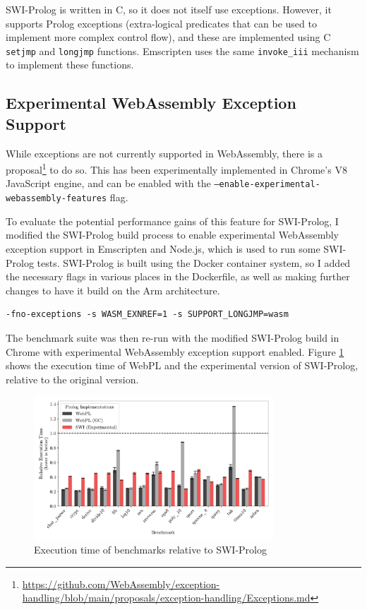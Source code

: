 SWI-Prolog is written in C, so it does not itself use exceptions. However, it supports Prolog exceptions (extra-logical predicates that can be used to implement more complex control flow), and these are implemented using C \texttt{setjmp} and \texttt{longjmp} functions. Emscripten uses the same \texttt{invoke\_iii} mechanism to implement these functions.

\subsection{Experimental WebAssembly Exception Support}

While exceptions are not currently supported in WebAssembly, there is a proposal\footnote{\url{https://github.com/WebAssembly/exception-handling/blob/main/proposals/exception-handling/Exceptions.md}} to do so. This has been experimentally implemented in Chrome's V8 JavaScript engine, and can be enabled with the \texttt{--enable-experimental-webassembly-features} flag.

To evaluate the potential performance gains of this feature for SWI-Prolog, I modified the SWI-Prolog build process to enable experimental WebAssembly exception support in Emscripten and Node.js, which is used to run some SWI-Prolog tests. SWI-Prolog is built using the Docker container system, so I added the necessary flags in various places in the Dockerfile, as well as making further changes to have it build on the Arm architecture.

\vspace*{-1em}

\begin{verbatim}
-fno-exceptions -s WASM_EXNREF=1 -s SUPPORT_LONGJMP=wasm
\end{verbatim}

\vspace*{-1em}

The benchmark suite was then re-run with the modified SWI-Prolog build in Chrome with experimental WebAssembly exception support enabled. Figure \ref{fig:swi-prolog-exception} shows the execution time of WebPL and the experimental version of SWI-Prolog, relative to the original version.

\begin{figure}[H]
\centering
\includegraphics[width=0.8\textwidth]{relative_performance_exnref.pdf}
\caption{Execution time of benchmarks relative to SWI-Prolog}
\label{fig:swi-prolog-exception}
\end{figure}

